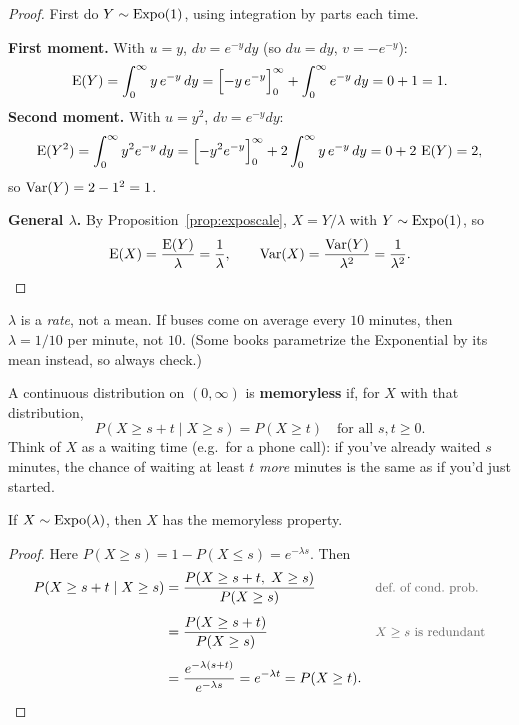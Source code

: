 \begin{proof}
  First do $Y \sim \operatorname{Expo}(1)$, using integration by parts each time.

  \textbf{First moment.} With $u = y$, $dv = e^{-y}dy$ (so $du = dy$, $v = -e^{-y}$):
  \[
    \operatorname{E}(Y) = \int_{0}^{\infty} y\, e^{-y}\,dy = \Bigl[-y\,e^{-y}\Bigr]_{0}^{\infty} + \int_{0}^{\infty} e^{-y}\,dy = 0 + 1 = 1.
  \]
  \textbf{Second moment.} With $u = y^{2}$, $dv = e^{-y}dy$:
  \[
    \operatorname{E}(Y^{2}) = \int_{0}^{\infty} y^{2} e^{-y}\,dy = \Bigl[-y^{2} e^{-y}\Bigr]_{0}^{\infty} + 2\int_{0}^{\infty} y\, e^{-y}\,dy = 0 + 2\,\operatorname{E}(Y) = 2,
  \]
  so $\operatorname{Var}(Y) = 2 - 1^{2} = 1$.

  \textbf{General $\lambda$.} By Proposition~\ref{prop:exposcale}, $X = Y/\lambda$ with $Y \sim \operatorname{Expo}(1)$, so
  \[
    \operatorname{E}(X) = \frac{\operatorname{E}(Y)}{\lambda} = \frac{1}{\lambda},
    \qquad
    \operatorname{Var}(X) = \frac{\operatorname{Var}(Y)}{\lambda^{2}} = \frac{1}{\lambda^{2}}.
  \]
\end{proof}

\begin{pitfall}
  $\lambda$ is a \emph{rate}, not a mean. If buses come on average every $10$ minutes, then $\lambda = 1/10$ per minute, not $10$. (Some books parametrize the Exponential by its mean instead, so always check.)
\end{pitfall}

\begin{definition}\label{def:memoryless}
  A continuous distribution on $(0, \infty)$ is \textbf{memoryless} if, for $X$ with that distribution,
  \[
    P(X \ge s + t \mid X \ge s) = P(X \ge t) \quad \text{for all } s, t \ge 0.
  \]
  Think of $X$ as a waiting time (e.g.\ for a phone call): if you've already waited $s$ minutes, the chance of waiting at least $t$ \emph{more} minutes is the same as if you'd just started.
\end{definition}

\begin{theorem}\label{thm:expomemoryless}
  If $X \sim \operatorname{Expo}(\lambda)$, then $X$ has the memoryless property.
\end{theorem}

\begin{proof}
  Here $P(X \ge s) = 1 - P(X \le s) = e^{-\lambda s}$. Then
  \begin{align*}
    P(X \ge s + t \mid X \ge s)
      &= \frac{P(X \ge s + t,\; X \ge s)}{P(X \ge s)}
      && \by{def.\ of cond.\ prob.} \\[0.4em]
      &= \frac{P(X \ge s + t)}{P(X \ge s)}
      && \by{$X \ge s$ is redundant} \\[0.4em]
      &= \frac{e^{-\lambda(s + t)}}{e^{-\lambda s}} = e^{-\lambda t} = P(X \ge t).
  \end{align*}
\end{proof}

